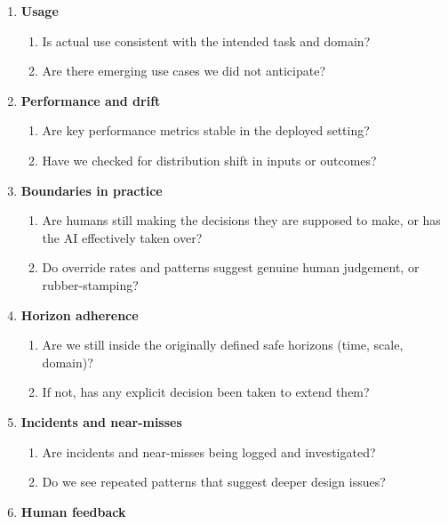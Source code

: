 \begin{enumerate}
  \item \textbf{Usage}
        \begin{enumerate}
          \item Is actual use consistent with the intended task and
                domain?
          \item Are there emerging use cases we did not anticipate?
        \end{enumerate}
  \item \textbf{Performance and drift}
        \begin{enumerate}
          \item Are key performance metrics stable in the deployed
                setting?
          \item Have we checked for distribution shift in inputs or
                outcomes?
        \end{enumerate}
  \item \textbf{Boundaries in practice}
        \begin{enumerate}
          \item Are humans still making the decisions they are supposed
                to make, or has the AI effectively taken over?
          \item Do override rates and patterns suggest genuine human
                judgement, or rubber-stamping?
        \end{enumerate}
  \item \textbf{Horizon adherence}
        \begin{enumerate}
          \item Are we still inside the originally defined safe horizons
                (time, scale, domain)?
          \item If not, has any explicit decision been taken to extend
                them?
        \end{enumerate}
  \item \textbf{Incidents and near-misses}
        \begin{enumerate}
          \item Are incidents and near-misses being logged and
                investigated?
          \item Do we see repeated patterns that suggest deeper design
                issues?
        \end{enumerate}
  \item \textbf{Human feedback}
        \begin{enumerate}

\end{enumerate}
\end{enumerate}
